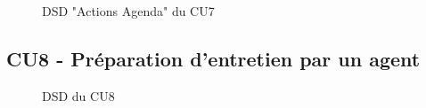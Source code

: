 \begin{figure}[H]
\noindent{}
\caption{DSD "Actions Agenda" du CU7}
\end{figure}


\subsection{CU8 - Préparation d’entretien par un agent}
\begin{figure}[H]
\noindent{}
\caption{DSD du CU8}
\end{figure}

